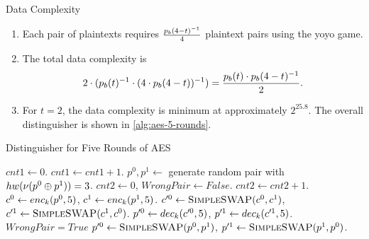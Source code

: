 \documentclass[notheorems]{beamer}
\theoremstyle{definition}
\theoremstyle{example}
\begin{document}
    \begin{frame}{Data Complexity}
        \begin{enumerate}
            \item<1-> Each pair of plaintexts requires \(\frac{p_b(4 -
            t)^{-1}}{4}\) plaintext pairs using the yoyo game. 
            \item<2-> The total data complexity is
            \begin{equation}
                2 \cdot (p_b(t)^{-1} \cdot (4 \cdot p_b(4 - t))^{-1}) = \frac{p_b(t) \cdot p_b(4 - t)^{-1}}{2}.
            \end{equation}
            \item<3-> For \(t = 2\), the data complexity is minimum at
            approximately \(2^{25.8}\). The overall distinguisher is shown in
            \cref{alg:aes-5-rounds}.
        \end{enumerate} 
    \end{frame}

    \begin{frame}[allowframebreaks]{Distinguisher for Five Rounds of AES}
            \label{alg:aes-5-rounds}
            \begin{algorithmic}[1]
                \State \(cnt1 \gets 0\).
                    \State \(cnt1 \gets cnt1 + 1\).
                    \State \(p^0, p^1 \gets\) generate random pair with
                    \(hw(\nu(p^0 \oplus p^1)) = 3\).
                    \State \(cnt2 \gets 0\), \(WrongPair \gets False\).
                        \State \(cnt2 \gets cnt2 + 1\).
                        \State \(c^0 \gets enc_k(p^0, 5)\), \(c^1 \gets
                        enc_k(p^1, 5)\).
                        \State \(c^{\prime 0} \gets \textsc{SimpleSWAP}(c^0,
                        c^1)\), \(c^{\prime 1} \gets \textsc{SimpleSWAP}(c^1,
                        c^0)\).
                        \State \(p^{\prime 0} \gets dec_k(c^{\prime 0}, 5)\),
                        \(p^{\prime 1} \gets dec_k(c^{\prime 1}, 5)\).
                                \State \(WrongPair = True\)
                            \EndIf
                        \EndFor
                        \State \(p^{\prime 0} \gets \textsc{SimpleSWAP}(p^0,
                        p^1)\), \(p^{\prime 1} \gets \textsc{SimpleSWAP}(p^1,
                        p^0)\).
                    \EndWhile
                        \State {} 
                    \EndIf
                \EndWhile
                \State {}
            \end{algorithmic}
    \end{frame}
\end{document}
